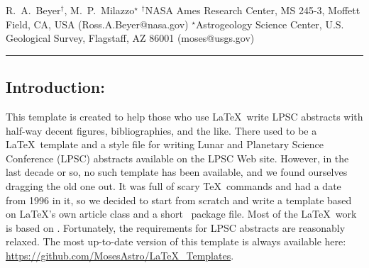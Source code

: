 \documentclass[twoside]{article}
\begin{document}

{R.~A.~Beyer$^{\dag}$, M.~P.~Milazzo$^{\star}$ $^{\dag}$NASA Ames Research Center, MS 245-3, Moffett Field, CA, USA (Ross.A.Beyer@nasa.gov) $^{\star}
$Astrogeology Science Center, U.S. Geological Survey, Flagstaff, AZ 86001 (moses@usgs.gov) \\ \hrule
} 

%

%


\balance


\subsection*{\hspace{0.5cm}Introduction:} This template is created to help those who use \LaTeX\ write LPSC abstracts with half-way decent figures, bibliographies, 
and the like.
There used to be a \LaTeX\ template and a style file for writing Lunar and Planetary Science Conference (LPSC) abstracts available
on the LPSC Web site.
However, in the last decade or so, no such template has been available, and we found ourselves dragging the old one out.
It was full of scary \TeX\ commands and had a date from 1996 in it, so we decided to start from scratch and write a template based on \LaTeX's own article class and a short \LaTeXe\ package file.  
Most of the \LaTeX\ work is based on \citep{kopka2003guide}.
Fortunately, the requirements for LPSC abstracts \citep{LPSC} are reasonably relaxed.
The most up-to-date version of this template is always available here:\\
\url{https://github.com/MosesAstro/LaTeX_Templates}.
\end{document}
